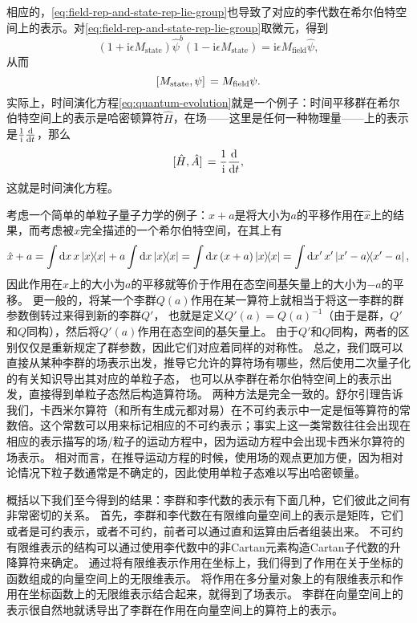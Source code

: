 \documentclass[hyperref, UTF8, a4paper]{ctexart}
\newcommand*{\ii}{\mathrm{i}}
\begin{document}
相应的，\eqref{eq:field-rep-and-state-rep-lie-group}也导致了对应的李代数在希尔伯特空间上的表示。对\eqref{eq:field-rep-and-state-rep-lie-group}取微元，得到
\[
    (1 + \ii \epsilon M_\text{state}) \hat{\psi}^b (1 - \ii \epsilon M_\text{state}) = \ii \epsilon M_\text{field} \hat{\psi},
\]
从而
\begin{equation}
    \comm*{M_\text{state}}{\psi} = M_\text{field} \psi.
    \label{eq:field-rep-and-state-rep-gen}
\end{equation}
实际上，时间演化方程\eqref{eq:quantum-evolution}就是一个例子：时间平移群在希尔伯特空间上的表示是哈密顿算符$\hat{H}$，在场——这里是任何一种物理量——上的表示是$\frac{1}{\ii} \dv{t}$，那么
\[
    \comm*{\hat{H}}{\hat{A}} = \frac{1}{\ii} \dv{t},
\]
这就是时间演化方程。

考虑一个简单的单粒子量子力学的例子：$\hat{x} + a$是将大小为$a$的平移作用在$\hat{x}$上的结果，而考虑被$\hat{x}$完全描述的一个希尔伯特空间，在其上有
\[
    \hat{x} + a = \int \dd{x} x \dyad{x} + a \int \dd{x} \dyad{x} 
    = \int \dd{x} (x + a) \dyad{x} = \int \dd{x'} x' \dyad{x'-a},
\]
因此作用在$\hat{x}$上的大小为$a$的平移就等价于作用在态空间基矢量上的大小为$-a$的平移。
更一般的，将某一个李群$Q(a)$作用在某一算符上就相当于将这一李群的群参数倒转过来得到新的李群$Q'$，
也就是定义$Q'(a) = Q(a)^{-1}$（由于是群，$Q'$和$Q$同构），然后将$Q'(a)$作用在态空间的基矢量上。
由于$Q'$和$Q$同构，两者的区别仅仅是重新规定了群参数，因此它们对应着同样的对称性。
总之，我们既可以直接从某种李群的场表示出发，推导它允许的算符场有哪些，然后使用二次量子化的有关知识导出其对应的单粒子态，
也可以从李群在希尔伯特空间上的表示出发，直接得到单粒子态然后构造算符场。
两种方法是完全一致的。舒尔引理告诉我们，卡西米尔算符（和所有生成元都对易）在不可约表示中一定是恒等算符的常数倍。这个常数可以用来标记相应的不可约表示；事实上这一类常数往往会出现在相应的表示描写的场/粒子的运动方程中，因为运动方程中会出现卡西米尔算符的场表示。
相对而言，在推导运动方程的时候，使用场的观点更加方便，因为相对论情况下粒子数通常是不确定的，因此使用单粒子态难以写出哈密顿量。

概括以下我们至今得到的结果：李群和李代数的表示有下面几种，它们彼此之间有非常密切的关系。
首先，李群和李代数在有限维向量空间上的表示是矩阵，它们或者是可约表示，或者不可约，前者可以通过直和运算由后者组装出来。
不可约有限维表示的结构可以通过使用李代数中的非Cartan元素构造Cartan子代数的升降算符来确定。
通过将有限维表示作用在坐标上，我们得到了作用在关于坐标的函数组成的向量空间上的无限维表示。
将作用在多分量对象上的有限维表示和作用在坐标函数上的无限维表示结合起来，就得到了场表示。
李群在向量空间上的表示很自然地就诱导出了李群在作用在向量空间上的算符上的表示。
\end{document}
